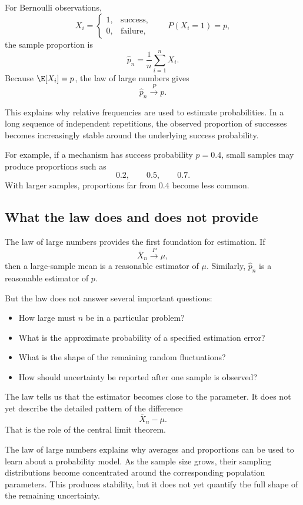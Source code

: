 For Bernoulli observations,
\[
X_i=
\begin{cases}
1,&\text{success},\\
0,&\text{failure},
\end{cases}
\qquad
P(X_i=1)=p,
\]
the sample proportion is
\[
\widehat p_n=\frac1n\sum_{i=1}^nX_i.
\]
Because \(\E[X_i]=p\), the law of large numbers gives
\[
\widehat p_n\xrightarrow{P}p.
\]

This explains why relative frequencies are used to estimate probabilities. In a
long sequence of independent repetitions, the observed proportion of successes
becomes increasingly stable around the underlying success probability.

For example, if a mechanism has success probability \(p=0.4\), small samples may
produce proportions such as
\[
0.2,\qquad 0.5,\qquad 0.7.
\]
With larger samples, proportions far from \(0.4\) become less common.

\subsection*{What the law does and does not provide}

The law of large numbers provides the first foundation for estimation. If
\[
\overline X_n\xrightarrow{P}\mu,
\]
then a large-sample mean is a reasonable estimator of \(\mu\). Similarly,
\(\widehat p_n\) is a reasonable estimator of \(p\).

But the law does not answer several important questions:

\begin{itemize}
    \item How large must \(n\) be in a particular problem?
    \item What is the approximate probability of a specified estimation error?
    \item What is the shape of the remaining random fluctuations?
    \item How should uncertainty be reported after one sample is observed?
\end{itemize}

The law tells us that the estimator becomes close to the parameter. It does not
yet describe the detailed pattern of the difference
\[
\overline X_n-\mu.
\]
That is the role of the central limit theorem.

\begin{summarybox}
The law of large numbers explains why averages and proportions can be used to
learn about a probability model. As the sample size grows, their sampling
distributions become concentrated around the corresponding population
parameters. This produces stability, but it does not yet quantify the full shape
of the remaining uncertainty.
\end{summarybox}
